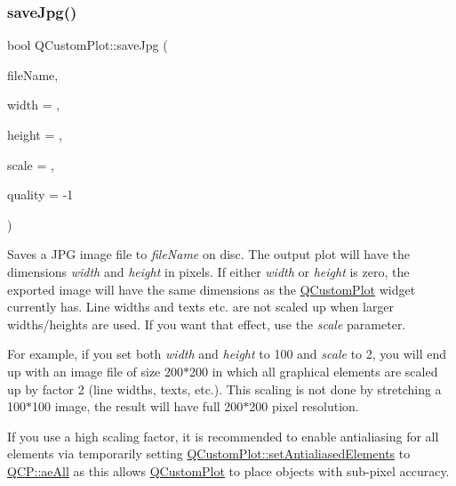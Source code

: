 \subsubsection{\texorpdfstring{save\+Jpg()}{saveJpg()}}
{\footnotesize\ttfamily bool Q\+Custom\+Plot\+::save\+Jpg (\begin{DoxyParamCaption}\item[{const Q\+String \&}]{file\+Name,  }\item[{int}]{width = {},  }\item[{int}]{height = {},  }\item[{double}]{scale = {},  }\item[{int}]{quality = {\ttfamily -\/1} }\end{DoxyParamCaption})}

Saves a J\+PG image file to {\itshape file\+Name} on disc. The output plot will have the dimensions {\itshape width} and {\itshape height} in pixels. If either {\itshape width} or {\itshape height} is zero, the exported image will have the same dimensions as the \hyperlink{class_q_custom_plot}{Q\+Custom\+Plot} widget currently has. Line widths and texts etc. are not scaled up when larger widths/heights are used. If you want that effect, use the {\itshape scale} parameter.

For example, if you set both {\itshape width} and {\itshape height} to 100 and {\itshape scale} to 2, you will end up with an image file of size 200$\ast$200 in which all graphical elements are scaled up by factor 2 (line widths, texts, etc.). This scaling is not done by stretching a 100$\ast$100 image, the result will have full 200$\ast$200 pixel resolution.

If you use a high scaling factor, it is recommended to enable antialiasing for all elements via temporarily setting \hyperlink{class_q_custom_plot_af6f91e5eab1be85f67c556e98c3745e8}{Q\+Custom\+Plot\+::set\+Antialiased\+Elements} to \hyperlink{namespace_q_c_p_ae55dbe315d41fe80f29ba88100843a0caa897c232a0ffc8368e7c100ffc59ef31}{Q\+C\+P\+::ae\+All} as this allows \hyperlink{class_q_custom_plot}{Q\+Custom\+Plot} to place objects with sub-\/pixel accuracy.

